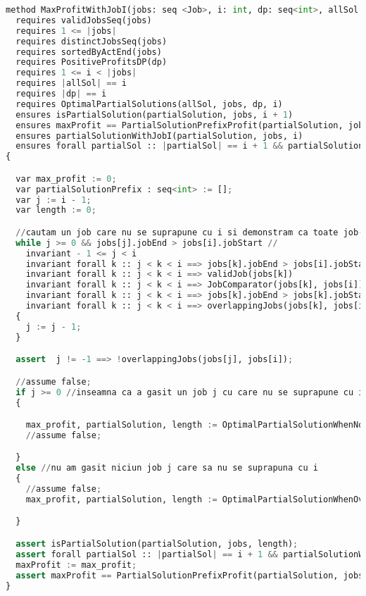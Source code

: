 \begin{lstlisting}[language=Python]
    method MaxProfitWithJobI(jobs: seq <Job>, i: int, dp: seq<int>, allSol :seq<seq<int>>) returns (maxProfit:int, partialSolution: seq<int>)
  requires validJobsSeq(jobs)
  requires 1 <= |jobs|
  requires distinctJobsSeq(jobs)
  requires sortedByActEnd(jobs)
  requires PositiveProfitsDP(dp)
  requires 1 <= i < |jobs|
  requires |allSol| == i
  requires |dp| == i
  requires OptimalPartialSolutions(allSol, jobs, dp, i)
  ensures isPartialSolution(partialSolution, jobs, i + 1)
  ensures maxProfit == PartialSolutionPrefixProfit(partialSolution, jobs, 0)
  ensures partialSolutionWithJobI(partialSolution, jobs, i)
  ensures forall partialSol :: |partialSol| == i + 1 && partialSolutionWithJobI(partialSol, jobs, i) ==> HasLessProfit(partialSol, jobs, maxProfit, 0)
{

  var max_profit := 0;
  var partialSolutionPrefix : seq<int> := [];
  var j := i - 1;
  var length := 0;

  //cautam un job care nu se suprapune cu i si demonstram ca toate job-urile dintre j si i se suprapun cu i
  while j >= 0 && jobs[j].jobEnd > jobs[i].jobStart //
    invariant - 1 <= j < i
    invariant forall k :: j < k < i ==> jobs[k].jobEnd > jobs[i].jobStart //se suprapun
    invariant forall k :: j < k < i ==> validJob(jobs[k])
    invariant forall k :: j < k < i ==> JobComparator(jobs[k], jobs[i]) //din OrderedByEnd
    invariant forall k :: j < k < i ==> jobs[k].jobEnd > jobs[k].jobStart //din ValidJob
    invariant forall k :: j < k < i ==> overlappingJobs(jobs[k], jobs[i]) //stiu doar despre ultimul job j ca nu se suprapune cu i
  {
    j := j - 1;
  }

  assert  j != -1 ==> !overlappingJobs(jobs[j], jobs[i]);

  //assume false;
  if j >= 0 //inseamna ca a gasit un job j cu care nu se suprapune cu i (pe o pozitie >= 0)
  {

    max_profit, partialSolution, length := OptimalPartialSolutionWhenNonOverlapJob(jobs, i, dp, allSol, j);
    //assume false;

  }
  else //nu am gasit niciun job j care sa nu se suprapuna cu i
  {
    //assume false;
    max_profit, partialSolution, length := OptimalPartialSolutionWhenOverlapJob(jobs, i, dp);

  }

  assert isPartialSolution(partialSolution, jobs, length);
  assert forall partialSol :: |partialSol| == i + 1 && partialSolutionWithJobI(partialSol, jobs, i) ==> HasLessProfit(partialSol, jobs, max_profit, 0) ;
  maxProfit := max_profit;
  assert maxProfit == PartialSolutionPrefixProfit(partialSolution, jobs, 0);
}
\end{lstlisting}
